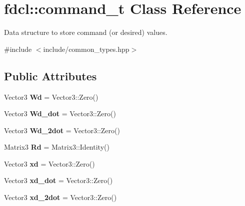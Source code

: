 \hypertarget{classfdcl_1_1command__t}{}\section{fdcl\+:\+:command\+\_\+t Class Reference}
\label{classfdcl_1_1command__t}


Data structure to store command (or desired) values.  




{\ttfamily \#include $<$include/common\+\_\+types.\+hpp$>$}

\subsection*{Public Attributes}
\begin{DoxyCompactItemize}
\item 
Vector3 {\bfseries Wd} = Vector3\+::\+Zero()\hypertarget{classfdcl_1_1command__t_a951c228eb6c8cabcdd3fffd3d378fd0a}{}\label{classfdcl_1_1command__t_a951c228eb6c8cabcdd3fffd3d378fd0a}

\item 
Vector3 {\bfseries Wd\+\_\+dot} = Vector3\+::\+Zero()\hypertarget{classfdcl_1_1command__t_a089d1bf0a2be6eecd25f1dc0b3b218e2}{}\label{classfdcl_1_1command__t_a089d1bf0a2be6eecd25f1dc0b3b218e2}

\item 
Vector3 {\bfseries Wd\+\_\+2dot} = Vector3\+::\+Zero()\hypertarget{classfdcl_1_1command__t_a11e06c9ee098901b9a4705a5f9b88902}{}\label{classfdcl_1_1command__t_a11e06c9ee098901b9a4705a5f9b88902}

\item 
Matrix3 {\bfseries Rd} = Matrix3\+::\+Identity()\hypertarget{classfdcl_1_1command__t_a95208aed71ff193f8d98813b52fc4920}{}\label{classfdcl_1_1command__t_a95208aed71ff193f8d98813b52fc4920}

\item 
Vector3 {\bfseries xd} = Vector3\+::\+Zero()\hypertarget{classfdcl_1_1command__t_a5540e79f1b8c99c8853c568d02ea2e34}{}\label{classfdcl_1_1command__t_a5540e79f1b8c99c8853c568d02ea2e34}

\item 
Vector3 {\bfseries xd\+\_\+dot} = Vector3\+::\+Zero()\hypertarget{classfdcl_1_1command__t_a02aa804c1d8e34f58ae030d9619dcda5}{}\label{classfdcl_1_1command__t_a02aa804c1d8e34f58ae030d9619dcda5}

\item 
Vector3 {\bfseries xd\+\_\+2dot} = Vector3\+::\+Zero()\hypertarget{classfdcl_1_1command__t_a01a7b45dc7c4e7b82e0916791d4ea3ef}{}\label{classfdcl_1_1command__t_a01a7b45dc7c4e7b82e0916791d4ea3ef}


\end{DoxyCompactItemize}
